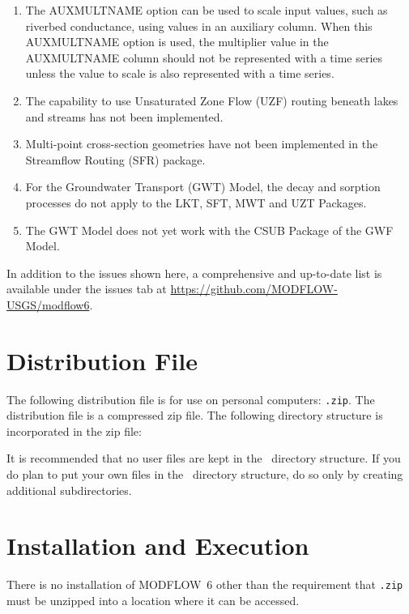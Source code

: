 \documentclass[11pt,twoside,twocolumn]{usgsreport}
\begin{document}
\begin{enumerate}

\item
The AUXMULTNAME option can be used to scale input values, such as riverbed conductance, using values in an auxiliary column.  When this AUXMULTNAME option is used, the multiplier value in the AUXMULTNAME column should not be represented with a time series unless the value to scale is also represented with a time series.  

\item
The capability to use Unsaturated Zone Flow (UZF) routing beneath lakes and streams has not been implemented.

\item
Multi-point cross-section geometries have not been implemented in the Streamflow Routing (SFR) package.

\item
For the Groundwater Transport (GWT) Model, the decay and sorption processes do not apply to the LKT, SFT, MWT and UZT Packages.

\item
The GWT Model does not yet work with the CSUB Package of the GWF Model.  

\end{enumerate}

In addition to the issues shown here, a comprehensive and up-to-date list is available under the issues tab at \url{https://github.com/MODFLOW-USGS/modflow6}.


\section{Distribution File}
The following distribution file is for use on personal computers: \texttt{\modflowversion.zip}.  The distribution file is a compressed zip file. The following directory structure is incorporated in the zip file:



It is recommended that no user files are kept in the \modflowversion~directory structure.  If you do plan to put your own files in the \modflowversion~directory structure, do so only by creating additional subdirectories.

\section{Installation and Execution}
There is no installation of MODFLOW~6 other than the requirement that \texttt{\modflowversion.zip} must be unzipped into a location where it can be accessed.  
\end{document}
